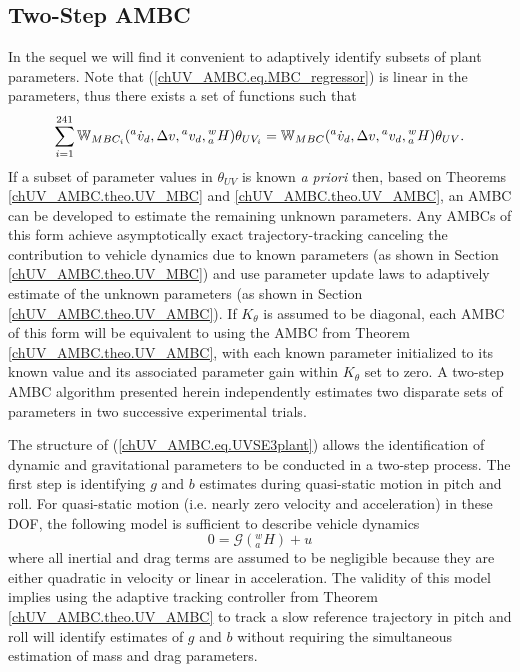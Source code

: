 \subsection{Two-Step \ac{AMBC}}\label{chUV_AMBC.sec.twoStepMethod}

In the sequel we will find it convenient to adaptively identify
subsets of plant parameters. Note that
(\ref{chUV_AMBC.eq.MBC_regressor}) is linear in the parameters, thus
there exists a set of functions \funDefn{\MBCregi}
{\times{}\times{}\times{}}
{}
%
such that 
%
\begin{equation}
\sum_{i=1}^{241}\mathbb{W}_{MBC_i}({^a}\dot{v}_d,\Delta v, {^a}v_d , {^w_a}H)\theta_{UV_i}
=\mathbb{W}_{MBC}({^a}\dot{v}_d,\Delta v, {^a}v_d , {^w_a}H)\theta_{UV}.
\end{equation}
%
\noindent If a subset of parameter values in $\theta_{UV}$ is known
{\it a priori} then, based on Theorems \ref{chUV_AMBC.theo.UV_MBC} and
\ref{chUV_AMBC.theo.UV_AMBC}, an \ac{AMBC} can be developed to
estimate the remaining unknown parameters.  Any \acp{AMBC} of this
form achieve asymptotically exact trajectory-tracking canceling the
contribution to vehicle dynamics due to known parameters (as shown in
Section \ref{chUV_AMBC.theo.UV_MBC}) and use parameter update laws to
adaptively estimate of the unknown parameters (as shown in Section
\ref{chUV_AMBC.theo.UV_AMBC}). If $K_\theta$ is assumed to be
diagonal, each \ac{AMBC} of this form will be equivalent to using the
\ac{AMBC} from Theorem \ref{chUV_AMBC.theo.UV_AMBC}, with each known
parameter initialized to its known value and its associated parameter
gain within $K_\theta$ set to zero.  A two-step \ac{AMBC} algorithm presented
herein independently estimates two disparate sets of parameters in two
successive experimental trials.


The structure of (\ref{chUV_AMBC.eq.UVSE3plant}) allows the
identification of dynamic and gravitational parameters to be conducted
in a two-step process.  The first step is identifying $g$ and $b$
estimates during quasi-static motion in pitch and roll.
%
For quasi-static motion (i.e. nearly zero velocity and acceleration)
in these \ac{DOF}, the following model is sufficient to describe
vehicle dynamics
%
\begin{equation} \label{chUV_AMBC.eq.plantQS}
  0=\mathcal{G}({^w_a}H)+u 
\end{equation}
%
where all inertial and drag terms are assumed to be negligible because
they are either quadratic in velocity or linear in acceleration.  
%
The validity of this model implies using the adaptive tracking
controller from Theorem \ref{chUV_AMBC.theo.UV_AMBC} to track a slow
reference trajectory in pitch and roll will identify estimates of $g$
and $b$ without requiring the simultaneous estimation of mass and drag
parameters.


